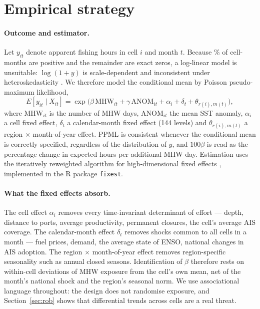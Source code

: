 \documentclass[12pt,a4paper]{article}
\begin{document}
\section{Empirical strategy}\label{sec:methods}
\paragraph{Outcome and estimator.} Let $y_{it}$ denote apparent fishing hours in cell $i$ and month $t$. Because \shareEffortPos{}\% of cell-months are positive and the remainder are exact zeros, a log-linear model is unsuitable: $\log(1+y)$ is scale-dependent and inconsistent under heteroskedasticity \citep{santossilva2006}. We therefore model the conditional mean by Poisson pseudo-maximum likelihood,
\begin{equation}\label{eq:main}
E[y_{it}\mid X_{it}] = \exp\!\big(\beta\,\mathrm{MHW}_{it} + \gamma\,\mathrm{ANOM}_{it} + \alpha_i + \delta_t + \theta_{r(i),m(t)}\big),
\end{equation}
where $\mathrm{MHW}_{it}$ is the number of MHW days, $\mathrm{ANOM}_{it}$ the mean SST anomaly, $\alpha_i$ a cell fixed effect, $\delta_t$ a calendar-month fixed effect (144 levels) and $\theta_{r(i),m(t)}$ a region $\times$ month-of-year effect. PPML is consistent whenever the conditional mean is correctly specified, regardless of the distribution of $y$, and $100\beta$ is read as the percentage change in expected hours per additional MHW day. Estimation uses the iteratively reweighted algorithm for high-dimensional fixed effects \citep{correia2020}, implemented in the R package \texttt{fixest}.

\paragraph{What the fixed effects absorb.} The cell effect $\alpha_i$ removes every time-invariant determinant of effort --- depth, distance to ports, average productivity, permanent closures, the cell's average AIS coverage. The calendar-month effect $\delta_t$ removes shocks common to all cells in a month --- fuel prices, demand, the average state of ENSO, national changes in AIS adoption. The region $\times$ month-of-year effect removes region-specific seasonality such as annual closed seasons. Identification of $\beta$ therefore rests on within-cell deviations of MHW exposure from the cell's own mean, net of the month's national shock and the region's seasonal norm. We use associational language throughout: the design does not randomise exposure, and Section~\ref{sec:rob} shows that differential trends across cells are a real threat.
\end{document}
